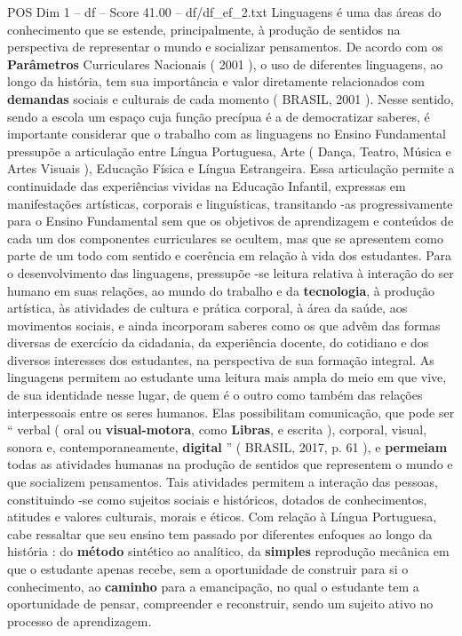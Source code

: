 \begin{textsample}{POS Dim 1 – df – Score 41.00 – df/df\_ef\_2.txt}  \label{ex:f1_pos_130}
Linguagens é uma das áreas do conhecimento que se estende, principalmente, à produção de sentidos na perspectiva de representar o mundo e socializar pensamentos.
De acordo com os \textbf{Parâmetros} Curriculares Nacionais ( 2001 ), o uso de diferentes linguagens, ao longo da história, tem sua importância e valor diretamente relacionados com \textbf{demandas} sociais e culturais de cada momento ( BRASIL, 2001 ).
Nesse sentido, sendo a escola um espaço cuja função precípua é a de democratizar saberes, é importante considerar que o trabalho com as linguagens no Ensino Fundamental pressupõe a articulação entre Língua Portuguesa, Arte ( Dança, Teatro, Música e Artes Visuais ), Educação Física e Língua Estrangeira.
Essa articulação permite a continuidade das experiências vividas na Educação Infantil, expressas em manifestações artísticas, corporais e linguísticas, transitando -as progressivamente para o Ensino Fundamental sem que os objetivos de aprendizagem e conteúdos de cada um dos componentes curriculares se ocultem, mas que se apresentem como parte de um todo com sentido e coerência em relação à vida dos estudantes.
Para o desenvolvimento das linguagens, pressupõe -se leitura relativa à interação do ser humano em suas relações, ao mundo do trabalho e da \textbf{tecnologia}, à produção artística, às atividades de cultura e prática corporal, à área da saúde, aos movimentos sociais, e ainda incorporam saberes como os que advêm das formas diversas de exercício da cidadania, da experiência docente, do cotidiano e dos diversos interesses dos estudantes, na perspectiva de sua formação integral.
As linguagens permitem ao estudante uma leitura mais ampla do meio em que vive, de sua identidade nesse lugar, de quem é o outro como também das relações interpessoais entre os seres humanos.
Elas possibilitam comunicação, que pode ser “ verbal ( oral ou \textbf{visual-motora}, como \textbf{Libras}, e escrita ), corporal, visual, sonora e, contemporaneamente, \textbf{digital} ” ( BRASIL, 2017, p. 61 ), e \textbf{permeiam} todas as atividades humanas na produção de sentidos que representem o mundo e que socializem pensamentos.
Tais atividades permitem a interação das pessoas, constituindo -se como sujeitos sociais e históricos, dotados de conhecimentos, atitudes e valores culturais, morais e éticos.
Com relação à Língua Portuguesa, cabe ressaltar que seu ensino tem passado por diferentes enfoques ao longo da história : do \textbf{método} sintético ao analítico, da \textbf{simples} reprodução mecânica em que o estudante apenas recebe, sem a oportunidade de construir para si o conhecimento, ao \textbf{caminho} para a emancipação, no qual o estudante tem a oportunidade de pensar, compreender e reconstruir, sendo um sujeito ativo no processo de aprendizagem.

\end{textsample}
